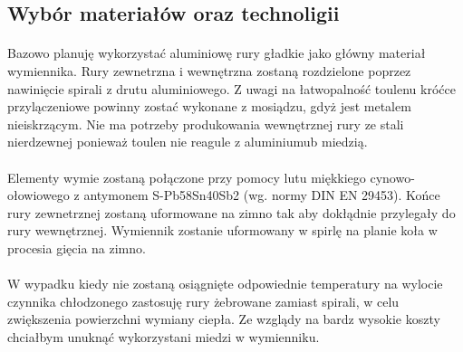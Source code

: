 \subsection{Wybór materiałów oraz technoligii}
\paragraph{}{
    Bazowo planuję wykorzystać aluminiowę rury gładkie jako główny materiał wymiennika.
    Rury zewnetrzna i wewnętrzna zostaną rozdzielone poprzez nawinięcie spirali z drutu aluminiowego.
    Z uwagi na łatwopalność toulenu króćce przylączeniowe powinny zostać wykonane z mosiądzu, gdyż jest metalem nieiskrzącym.
    Nie ma potrzeby produkowania wewnętrznej rury ze stali nierdzewnej ponieważ toulen nie reagule z aluminiumub miedzią.
}
\paragraph{}{
    Elementy wymie zostaną połączone przy pomocy lutu miękkiego cynowo-ołowiowego z antymonem S-Pb58Sn40Sb2 (wg. normy DIN EN 29453).
    Końce rury zewnetrznej zostaną uformowane na zimno tak aby dokłądnie przylegały do rury wewnętrznej.
    Wymiennik zostanie uformowany w spirlę na planie koła w procesia gięcia na zimno.
}
\paragraph{}{
    W wypadku kiedy nie zostaną osiągnięte odpowiednie temperatury na wylocie czynnika chłodzonego zastosuję rury żebrowane zamiast spirali, w celu zwiększenia powierzchni wymiany ciepła.
    Ze wzglądy na bardz wysokie koszty chciałbym unuknąć wykorzystani miedzi w wymienniku.
}